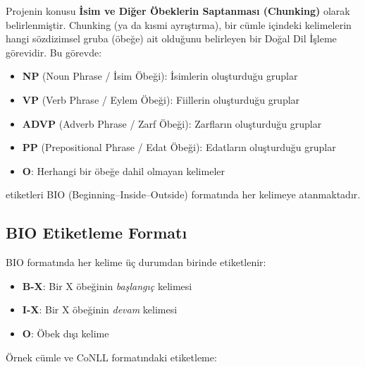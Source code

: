 \documentclass[12pt,a4paper]{article}
\begin{document}
Projenin konusu \textbf{İsim ve Diğer Öbeklerin Saptanması (Chunking)} olarak belirlenmiştir.
Chunking (ya da kısmi ayrıştırma), bir cümle içindeki kelimelerin hangi sözdizimsel gruba
(öbeğe) ait olduğunu belirleyen bir Doğal Dil İşleme görevidir. Bu görevde:

\begin{itemize}
    \item \textbf{NP} (Noun Phrase / İsim Öbeği): İsimlerin oluşturduğu gruplar
    \item \textbf{VP} (Verb Phrase / Eylem Öbeği): Fiillerin oluşturduğu gruplar
    \item \textbf{ADVP} (Adverb Phrase / Zarf Öbeği): Zarfların oluşturduğu gruplar
    \item \textbf{PP} (Prepositional Phrase / Edat Öbeği): Edatların oluşturduğu gruplar
    \item \textbf{O}: Herhangi bir öbeğe dahil olmayan kelimeler
\end{itemize}

etiketleri BIO (Beginning--Inside--Outside) formatında her kelimeye atanmaktadır.

\subsection{BIO Etiketleme Formatı}

BIO formatında her kelime üç durumdan birinde etiketlenir:
\begin{itemize}
    \item \textbf{B-X}: Bir X öbeğinin \textit{başlangıç} kelimesi
    \item \textbf{I-X}: Bir X öbeğinin \textit{devam} kelimesi
    \item \textbf{O}: Öbek dışı kelime
\end{itemize}

Örnek cümle ve CoNLL formatındaki etiketleme:
\end{document}

